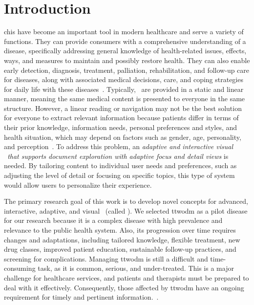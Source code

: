 \section{Introduction}


\acrfull{chis} have become an important tool in modern healthcare and serve a variety of functions. 
%
They can provide consumers with a comprehensive understanding of a disease, specifically addressing general knowledge of health-related issues, effects, ways, and measures to maintain and possibly restore health. 
%
They can also enable early detection, diagnosis, treatment, palliation, rehabilitation, and follow-up care for diseases, along with associated medical decisions, care, and coping strategies for daily life with these diseases~\cite{RN1}. 
%
Typically, \chis\ are provided in a static and linear manner, meaning the same medical content is presented to everyone in the same structure. 
%
However, a linear reading or navigation may not be the best solution for everyone to extract relevant information because patients differ in terms of their prior knowledge, information needs, personal preferences and styles, and health situation, which may depend on factors such as gender, age, personality, and perception~\cite{RN3}. 
%
To address this problem, an \emph{adaptive and interactive visual \chis\ that supports document exploration with adaptive focus and detail views} is needed. 
%
By tailoring content to individual user needs and preferences, such as adjusting the level of detail or focusing on specific topics, this type of system would allow users to personalize their experience.


The primary research goal of this work is to develop novel concepts for advanced, interactive, adaptive, and visual \chis\ (called \apluschis). 
%
We selected \acrfull{ttwodm} as a pilot disease for our research because it is a complex disease with high prevalence and relevance to the public health system. 
%
Also, its progression over time requires changes and adaptations, including tailored knowledge, flexible treatment, new drug classes, improved patient education, sustainable follow-up practices, and screening for complications. Managing \acrshort{ttwodm} is still a difficult and time-consuming task, as it is common, serious, and under-treated. 
%
This is a major challenge for healthcare services, and patients and therapists must be prepared to deal with it effectively. 
%
Consequently, those affected by \acrshort{ttwodm} have an ongoing requirement for timely and pertinent information.~\cite{RN6}.



